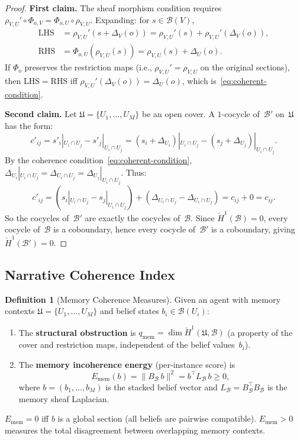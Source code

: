 \documentclass[11pt,a4paper]{article}
\theoremstyle{plain}
\theoremstyle{definition}
\newtheorem{definition}[theorem]{Definition}
\theoremstyle{remark}
\newcommand{\cB}{\mathcal{B}}
\newcommand{\fU}{\mathfrak{U}}
\newcommand{\CechH}{\check{H}}
\begin{document}
\begin{proof}
\textbf{First claim.} The sheaf morphism condition requires $\rho_{V,U}' \circ \Phi_{o,V} = \Phi_{o,U} \circ \rho_{V,U}$. Expanding: for $s \in \cB(V)$,
\begin{align*}
\text{LHS} &= \rho_{V,U}'(s + \Delta_V(o)) = \rho_{V,U}'(s) + \rho_{V,U}'(\Delta_V(o)), \\
\text{RHS} &= \Phi_{o,U}(\rho_{V,U}(s)) = \rho_{V,U}(s) + \Delta_U(o).
\end{align*}
If $\Phi_o$ preserves the restriction maps (i.e., $\rho_{V,U}' = \rho_{V,U}$ on the original sections), then LHS$=$RHS iff $\rho_{V,U}'(\Delta_V(o)) = \Delta_U(o)$, which is~\eqref{eq:coherent-condition}.

\textbf{Second claim.} Let $\fU = \{U_1, \ldots, U_M\}$ be an open cover. A $1$-cocycle of~$\cB'$ on~$\fU$ has the form:
\[
c'_{ij} = s'_i|_{U_i \cap U_j} - s'_j|_{U_i \cap U_j} = (s_i + \Delta_{U_i})|_{U_i \cap U_j} - (s_j + \Delta_{U_j})|_{U_i \cap U_j}.
\]
By the coherence condition~\eqref{eq:coherent-condition}, $\Delta_{U_i}|_{U_i \cap U_j} = \Delta_{U_i \cap U_j} = \Delta_{U_j}|_{U_i \cap U_j}$. Thus:
\[
c'_{ij} = (s_i|_{U_i \cap U_j} - s_j|_{U_i \cap U_j}) + (\Delta_{U_i \cap U_j} - \Delta_{U_i \cap U_j}) = c_{ij} + 0 = c_{ij}.
\]
So the cocycles of~$\cB'$ are exactly the cocycles of~$\cB$. Since $\CechH^1(\cB) = 0$, every cocycle of~$\cB$ is a coboundary, hence every cocycle of~$\cB'$ is a coboundary, giving $\CechH^1(\cB') = 0$.
\end{proof}

\subsection{Narrative Coherence Index}

\begin{definition}[Memory Coherence Measures]\label{def:mem-coh}
Given an agent with memory contexts $\fU = \{U_1, \ldots, U_M\}$ and belief states $b_i \in \cB(U_i)$:
\begin{enumerate}[label=(\roman*),nosep]
\item The \textbf{structural obstruction} is $q_{\mathrm{mem}} = \dim \CechH^1(\fU, \cB)$ (a property of the cover and restriction maps, independent of the belief values~$b_i$).
\item The \textbf{memory incoherence energy} (per-instance score) is
\[
E_{\mathrm{mem}}(b) = \|B_\cB\, b\|^2 = b^\top L_\cB\, b \geq 0,
\]
where $b = (b_1, \ldots, b_M)$ is the stacked belief vector and $L_\cB = B_\cB^\top B_\cB$ is the memory sheaf Laplacian.
\end{enumerate}
$E_{\mathrm{mem}} = 0$ iff $b$ is a global section (all beliefs are pairwise compatible). $E_{\mathrm{mem}} > 0$ measures the total disagreement between overlapping memory contexts.
\end{definition}
\end{document}
